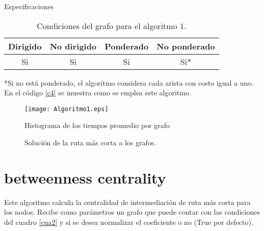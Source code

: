 \documentclass[12pt]{article}
\begin{document}
Especificaciones

\begin{table}[H] 
\caption{{\small Condiciones del grafo para el algoritmo 1.}}
\begin{center}
\begin{tabular}{|c|c|c|c|}
\hline
Dirigido & No dirigido & Ponderado & No ponderado \\ \hline
Si       & Si          & Si        & Si*        \\  \hline
\end{tabular}
\label{cua1}
\end{center}
\end{table}

*{\small Si no está ponderado, el algoritmo considera cada arista con costo igual a uno.}  \\

En el código \ref{c4} se muestra como se emplea este algoritmo.  

 \label{c4}


\begin{figure}[H]
\begin{center}
	\texttt{[image: Algoritmo1.eps]}
\end{center}
\vspace{-.3cm}
\caption{{\small Histograma de los tiempos promedio por grafo}}
\end{figure}

 
\begin{figure}[H]
\centering
{}\hspace{5mm}
\vspace{10mm}
\hspace{10mm}
\vspace{10mm}
\caption{Solución de la ruta más corta a los grafos.} \label{g1}
\end{figure}

\newpage
\section{betweenness centrality}
Este algoritmo calcula la centralidad de intermediación de ruta más corta para los nodos. Recibe como parámetros un grafo que puede contar con las condiciones del cuadro \ref{cua2} y si se desea normalizar el coeficiente o no (True por defecto). \\
\end{document}
